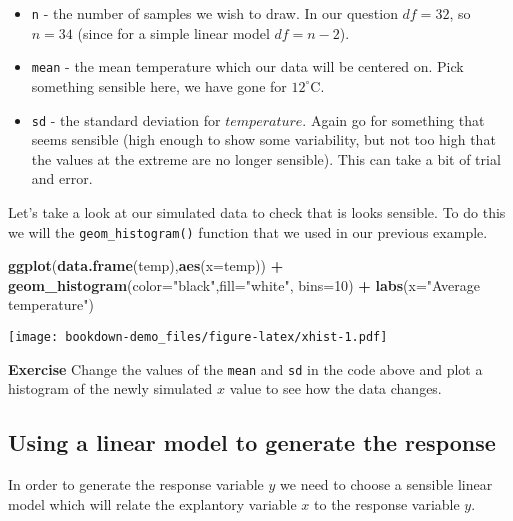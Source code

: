 \documentclass[
]{book}
\newenvironment{Shaded}{\begin{snugshade}}{\end{snugshade}}
\newcommand{\DataTypeTok}[1]{\textcolor[rgb]{0.13,0.29,0.53}{#1}}
\newcommand{\DecValTok}[1]{\textcolor[rgb]{0.00,0.00,0.81}{#1}}
\newcommand{\KeywordTok}[1]{\textcolor[rgb]{0.13,0.29,0.53}{\textbf{#1}}}
\newcommand{\NormalTok}[1]{#1}
\newcommand{\OperatorTok}[1]{\textcolor[rgb]{0.81,0.36,0.00}{\textbf{#1}}}
\newcommand{\StringTok}[1]{\textcolor[rgb]{0.31,0.60,0.02}{#1}}
\providecommand{\tightlist}{%
  \setlength{\itemsep}{0pt}\setlength{\parskip}{0pt}}
\begin{document}
\begin{itemize}
\tightlist
\item
  \texttt{n} - the number of samples we wish to draw. In our question \(df=32\), so \(n=34\) (since for a simple linear model \(df=n-2\)).
\item
  \texttt{mean} - the mean temperature which our data will be centered on. Pick something sensible here, we have gone for \(12^{\circ}\)C.
\item
  \texttt{sd} - the standard deviation for \(temperature\). Again go for something that seems sensible (high enough to show some variability, but not too high that the values at the extreme are no longer sensible). This can take a bit of trial and error.
\end{itemize}

Let's take a look at our simulated data to check that is looks sensible. To do this we will the \texttt{geom\_histogram()} function that we used in our previous example.

\begin{Shaded}
\begin{Highlighting}[]
\KeywordTok{ggplot}\NormalTok{(}\KeywordTok{data.frame}\NormalTok{(temp),}\KeywordTok{aes}\NormalTok{(}\DataTypeTok{x=}\NormalTok{temp)) }\OperatorTok{+}\StringTok{ }
\StringTok{  }\KeywordTok{geom_histogram}\NormalTok{(}\DataTypeTok{color=}\StringTok{"black"}\NormalTok{,}\DataTypeTok{fill=}\StringTok{"white"}\NormalTok{, }\DataTypeTok{bins=}\DecValTok{10}\NormalTok{) }\OperatorTok{+}\StringTok{ }
\StringTok{            }\KeywordTok{labs}\NormalTok{(}\DataTypeTok{x=}\StringTok{"Average temperature"}\NormalTok{)}
\end{Highlighting}
\end{Shaded}

\texttt{[image: bookdown-demo\_files/figure-latex/xhist-1.pdf]}

\textbf{Exercise}
Change the values of the \texttt{mean} and \texttt{sd} in the code above and plot a histogram of the newly simulated \(x\) value to see how the data changes.

\hypertarget{using-a-linear-model-to-generate-the-response}{%
\subsection{Using a linear model to generate the response}\label{using-a-linear-model-to-generate-the-response}}

In order to generate the response variable \(y\) we need to choose a sensible linear model which will relate the explantory variable \(x\) to the response variable \(y\).
\end{document}
